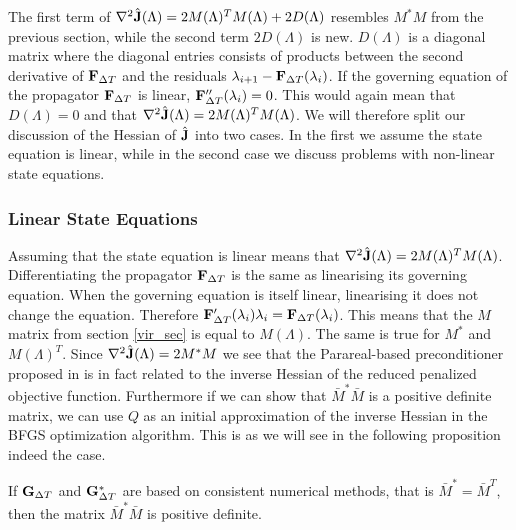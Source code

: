 \noindent
The first term of $\nabla^2 \hat{\bold J}(\Lambda)=2M(\Lambda)^TM(\Lambda) + 2D(\Lambda)$ resembles $M^*M$ from the previous section, while the second term $2D(\Lambda)$ is new. $D(\Lambda)$ is a diagonal matrix where the diagonal entries consists of products between the second derivative of $\bold F_ {\Delta T}$ and the residuals $\lambda_{i+1}-\bold F_{\Delta T}(\lambda_i)$. If the governing equation of the propagator $\bold F_ {\Delta T}$ is linear, $\bold F_{\Delta T}''(\lambda_i)=0$. This would again mean that $D(\Lambda)=0$ and that $\nabla^2 \hat{\bold J}(\Lambda)=2M(\Lambda)^TM(\Lambda)$. We will therefore split our discussion of the Hessian of $\hat{\bold J}$ into two cases. In the first we assume the state equation is linear, while in the second case we discuss problems with non-linear state equations.
\subsubsection{Linear State Equations}
Assuming that the state equation is linear means that $\nabla^2 \hat{\bold J}(\Lambda)=2M(\Lambda)^TM(\Lambda)$. Differentiating the propagator $\bold F_{\Delta T}$ is the same as linearising its governing equation. When the governing equation is itself linear, linearising it does not change the equation. Therefore $\bold F_{\Delta T}'(\lambda_i)\lambda_i = \bold F_{\Delta T}(\lambda_i)$. This means that the $M$ matrix from section \ref{vir_sec} is equal to $M(\Lambda)$. The same is true for $M^*$ and $M(\Lambda)^T$. Since  $\nabla^2 \hat{\bold J}(\Lambda)=2M^*M$ we see that the Parareal-based preconditioner proposed in \cite{maday2002parareal} is in fact related to the inverse Hessian of the reduced penalized objective function. Furthermore if we can show that $\bar M^*\bar M$ is a positive definite matrix, we can use $Q$ as an initial approximation of the inverse Hessian in the BFGS optimization algorithm. This is as we will see in the following proposition indeed the case.
\begin{proposition} \label{pos_def_prop}
If $\bold G_{\Delta T}$ and $\bold G_{\Delta T}^*$ are based on consistent numerical methods, that is $\bar M^*=\bar M^T$, then the matrix $\bar M^*\bar M$ is positive definite.
\end{proposition}

